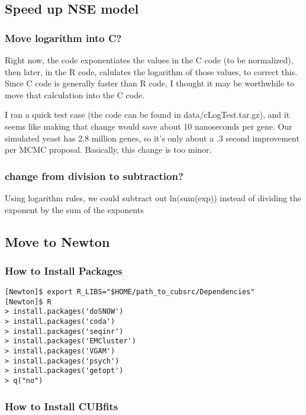 \subsection{Speed up NSE model}

\subsubsection{Move logarithm into C?}

Right now, the code exponentiates the values in the C code (to be normalized), then later, in the R code, calulates the logarithm of those values, to correct this. Since C code is generally faster than R code, I thought it may be worthwhile to move that calculation into the C code.

I ran a quick test case (the code can be found in data/cLogTest.tar.gz), and it seems like making that change would save about 10 nanoseconds per gene. Our simulated yeast has 2.8 million genes, so it's only about a .3 second improvement per MCMC proposal. Basically, this change is too minor.

\subsubsection{change from division to subtraction?}

Using logarithm rules, we could subtract out ln(sum(exp)) instead of dividing the exponent by the sum of the exponents

\subsection{Move to Newton}

\subsubsection{How to Install Packages}

\begin{verbatim}
[Newton]$ export R_LIBS="$HOME/path_to_cubsrc/Dependencies"
[Newton]$ R
> install.packages('doSNOW')
> install.packages('coda')
> install.packages('seqinr')
> install.packages('EMCluster')
> install.packages('VGAM')
> install.packages('psych')
> install.packages('getopt')
> q("no")
\end{verbatim}

\subsubsection{How to Install CUBfits}

